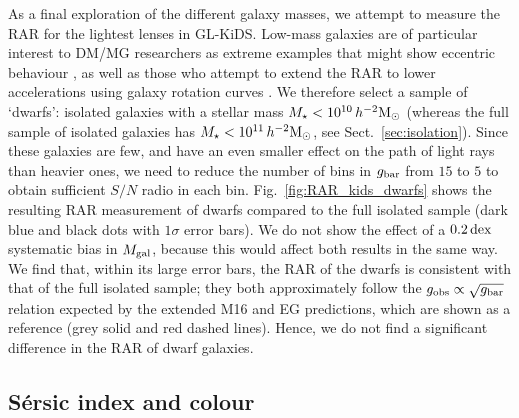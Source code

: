 \documentclass[usenatbib]{mnras}
\newcommand{\hmsun}{\,h^{-2} {\rm M_\odot}}
\newcommand{\un}[1]{_{\rm #1}}
\newcommand{\dex}{\, {\rm dex}}
\begin{document}
As a final exploration of the different galaxy masses, we attempt to measure the RAR for the lightest lenses in GL-KiDS. Low-mass galaxies are of particular interest to DM/MG researchers as extreme examples that might show eccentric behaviour \citep{oman2016,dokkum2018,guo2020}, as well as those who attempt to extend the RAR to lower accelerations using galaxy rotation curves \citep{lelli2017b,paolo2019}. We therefore select a sample of `dwarfs': isolated galaxies with a stellar mass $M_\star<10^{10} \hmsun$ (whereas the full sample of isolated galaxies has $M_\star < 10^{11} \hmsun$, see Sect.~\ref{sec:isolation}). Since these galaxies are few, and have an even smaller effect on the path of light rays than heavier ones, we need to reduce the number of bins in $g\un{bar}$ from $15$ to $5$ to obtain sufficient $S/N$ radio in each bin. Fig.~\ref{fig:RAR_kids_dwarfs} shows the resulting RAR measurement of dwarfs compared to the full isolated sample (dark blue and black dots with $1\sigma$ error bars). We do not show the effect of a $0.2\dex$ systematic bias in $M\un{gal}$, because this would affect both results in the same way. We find that, within its large error bars, the RAR of the dwarfs is consistent with that of the full isolated sample; they both approximately follow the $g\un{obs}\propto\sqrt{g\un{bar}}$ relation expected by the extended M16 and EG predictions, which are shown as a reference (grey solid and red dashed lines). Hence, we do not find a significant difference in the RAR of dwarf galaxies.

\subsection{S\'ersic index and colour}
\label{sec:results-types}
\end{document}
